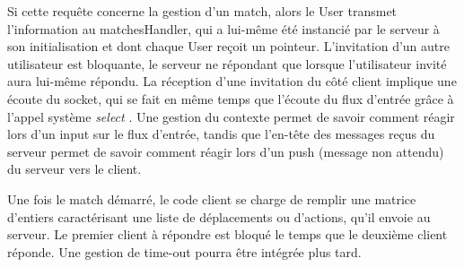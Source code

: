 \documentclass[a4paper,titlepage]{scrreprt}
\begin{document}
  Si cette requête concerne la gestion d'un match, alors le User transmet l'information
  au matchesHandler, qui a lui-même été instancié par le serveur à son initialisation et dont chaque
  User reçoit un pointeur.
  L'invitation d'un autre utilisateur est bloquante, le serveur ne répondant que
  lorsque l'utilisateur invité aura lui-même répondu. La réception d'une invitation
  du côté client implique une écoute du socket, qui se fait en même temps que l'écoute du flux
  d'entrée grâce à l'appel système \emph{select} . Une gestion du contexte
  permet de savoir comment réagir lors d'un input sur le flux d'entrée, tandis que
  l'en-tête des messages reçus du serveur permet de savoir comment réagir 
  lors d'un push (message non attendu) du serveur
  vers le client.
  
  Une fois le match démarré, le code client se charge de remplir une matrice d'entiers caractérisant
  une liste de déplacements ou d'actions, qu'il envoie au serveur. Le premier client à répondre
  est bloqué le temps que le deuxième client réponde. 
  Une gestion de time-out pourra être intégrée plus tard.
\end{document}
